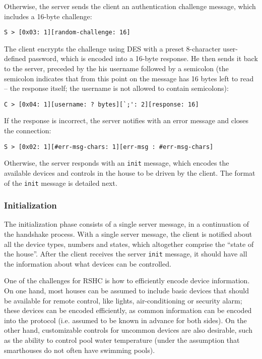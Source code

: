 \noindent
Otherwise, the server sends the client an authentication challenge message, which includes a 16-byte challenge:

\begin{verbatim}
S > [0x03: 1][random-challenge: 16]
\end{verbatim}

\noindent
The client encrypts the challenge using DES with a preset 8-character user-defined password, which is encoded into a 16-byte response. He then sends it back to the server, preceded by the his username followed by a semicolon (the semicolon indicates that from this point on the message has 16 bytes left to read -- the response itself; the username is not allowed to contain semicolons):

\begin{verbatim}
C > [0x04: 1][username: ? bytes][`;': 2][response: 16]
\end{verbatim}

\noindent
If the response is incorrect, the server notifies with an error message and closes the connection:
\begin{verbatim}
S > [0x02: 1][#err-msg-chars: 1][err-msg : #err-msg-chars]
\end{verbatim}

\noindent
Otherwise, the server responds with an {\tt init} message, which encodes the available devices and controls in the house to be driven by the client. The format of the {\tt init} message is detailed next.

\subsubsection{Initialization}
\label{sec:pdus:pdu:init}

The initialization phase consists of a single server message, in a continuation of the handshake process. With a single server message, the client is notified about all the device types, numbers and states, which altogether comprise the ``state of the house''. After the client receives the server {\tt init} message, it should have all the information about what devices can be controlled.

One of the challenges for RSHC is how to efficiently encode device information. On one hand, most houses can be assumed to include basic devices that should be available for remote control, like lights, air-conditioning or security alarm; these devices can be encoded efficiently, as common information can be encoded into the protocol (i.e. assumed to be known in advance for both sides). On the other hand, customizable controls for uncommon devices are also desirable, such as the ability to control pool water temperature (under the assumption that smarthouses do not often have swimming pools).

